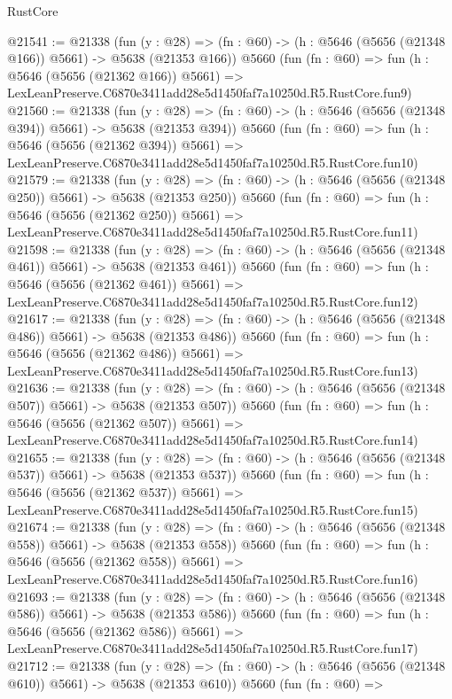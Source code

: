 \begin{lexlean}{RustCore}
\begin{coremodule}
@21541 := @21338
    (fun (y : @28) => (fn : @60) -> (h : @5646 (@5656 (@21348 @166)) @5661) -> @5638 (@21353 @166))
    @5660
    (fun (fn : @60) =>
    fun (h : @5646 (@5656 (@21362 @166)) @5661) =>
    LexLeanPreserve.C6870e3411add28e5d1450faf7a10250d.R5.RustCore.fun9)
@21560 := @21338
    (fun (y : @28) => (fn : @60) -> (h : @5646 (@5656 (@21348 @394)) @5661) -> @5638 (@21353 @394))
    @5660
    (fun (fn : @60) =>
    fun (h : @5646 (@5656 (@21362 @394)) @5661) =>
    LexLeanPreserve.C6870e3411add28e5d1450faf7a10250d.R5.RustCore.fun10)
@21579 := @21338
    (fun (y : @28) => (fn : @60) -> (h : @5646 (@5656 (@21348 @250)) @5661) -> @5638 (@21353 @250))
    @5660
    (fun (fn : @60) =>
    fun (h : @5646 (@5656 (@21362 @250)) @5661) =>
    LexLeanPreserve.C6870e3411add28e5d1450faf7a10250d.R5.RustCore.fun11)
@21598 := @21338
    (fun (y : @28) => (fn : @60) -> (h : @5646 (@5656 (@21348 @461)) @5661) -> @5638 (@21353 @461))
    @5660
    (fun (fn : @60) =>
    fun (h : @5646 (@5656 (@21362 @461)) @5661) =>
    LexLeanPreserve.C6870e3411add28e5d1450faf7a10250d.R5.RustCore.fun12)
@21617 := @21338
    (fun (y : @28) => (fn : @60) -> (h : @5646 (@5656 (@21348 @486)) @5661) -> @5638 (@21353 @486))
    @5660
    (fun (fn : @60) =>
    fun (h : @5646 (@5656 (@21362 @486)) @5661) =>
    LexLeanPreserve.C6870e3411add28e5d1450faf7a10250d.R5.RustCore.fun13)
@21636 := @21338
    (fun (y : @28) => (fn : @60) -> (h : @5646 (@5656 (@21348 @507)) @5661) -> @5638 (@21353 @507))
    @5660
    (fun (fn : @60) =>
    fun (h : @5646 (@5656 (@21362 @507)) @5661) =>
    LexLeanPreserve.C6870e3411add28e5d1450faf7a10250d.R5.RustCore.fun14)
@21655 := @21338
    (fun (y : @28) => (fn : @60) -> (h : @5646 (@5656 (@21348 @537)) @5661) -> @5638 (@21353 @537))
    @5660
    (fun (fn : @60) =>
    fun (h : @5646 (@5656 (@21362 @537)) @5661) =>
    LexLeanPreserve.C6870e3411add28e5d1450faf7a10250d.R5.RustCore.fun15)
@21674 := @21338
    (fun (y : @28) => (fn : @60) -> (h : @5646 (@5656 (@21348 @558)) @5661) -> @5638 (@21353 @558))
    @5660
    (fun (fn : @60) =>
    fun (h : @5646 (@5656 (@21362 @558)) @5661) =>
    LexLeanPreserve.C6870e3411add28e5d1450faf7a10250d.R5.RustCore.fun16)
@21693 := @21338
    (fun (y : @28) => (fn : @60) -> (h : @5646 (@5656 (@21348 @586)) @5661) -> @5638 (@21353 @586))
    @5660
    (fun (fn : @60) =>
    fun (h : @5646 (@5656 (@21362 @586)) @5661) =>
    LexLeanPreserve.C6870e3411add28e5d1450faf7a10250d.R5.RustCore.fun17)
@21712 := @21338
    (fun (y : @28) => (fn : @60) -> (h : @5646 (@5656 (@21348 @610)) @5661) -> @5638 (@21353 @610))
    @5660
    (fun (fn : @60) =>

\end{coremodule}
\end{lexlean}
